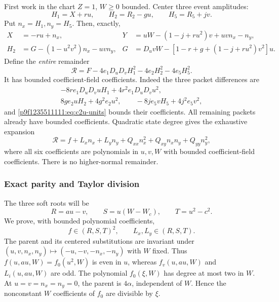 First work in the chart $Z=1$, $W\ge0$ bounded. Center three event amplitudes:
\[
 H_1=X+ru,\qquad H_2=R_2-gu,\qquad H_5=R_5+jv.
\]
Put $n_x=H_1,n_y=H_5$. Then, exactly,
\begin{align}
X&=-ru+n_x,&
Y&=uW-(1-j+ru^2)v+uvn_x-n_y,\label{p9f1235511111:eq:c2u-normal-sub}\\
H_2&=G-(1-u^2v^2)n_x-uvn_y,&
G&=D_uvW-[1-r+g+(1-j+ru^2)v^2]u.\label{p9f1235511111:eq:c2u-current}
\end{align}
Define the \emph{entire} remainder
\begin{equation}
\mathcal R=F-4e_1D_uD_vH_1^2-4e_2H_2^2-4e_5H_5^2.
\label{p9f1235511111:eq:c2u-remainder}
\end{equation}
It has bounded coefficient-field coefficients. Indeed the three packet
differences are
\begin{gather*}
-8re_1D_uD_vuH_1+4r^2e_1D_uD_vu^2,\\
8ge_2uH_2+4g^2e_2u^2,\qquad
-8je_5vH_5+4j^2e_5v^2,
\end{gather*}
and \eqref{p9f1235511111:eq:c2u-units} bounds their coefficients. All remaining
packets already have bounded coefficients. Quadratic state degree gives
the exhaustive expansion
\begin{equation}
\mathcal R=f+L_xn_x+L_yn_y
 +Q_{xx}n_x^2+Q_{xy}n_xn_y+Q_{yy}n_y^2,
\label{p9f1235511111:eq:c2u-normal-expansion}
\end{equation}
where all six coefficients are polynomials in $u,v,W$ with bounded
coefficient-field coefficients. There is no higher-normal remainder.

\subsubsection*{Exact parity and Taylor division}
The three soft roots will be
\begin{equation}
 R=au-v,\qquad S=u(W-W_c),\qquad T=u^2-c^2.
\label{p9f1235511111:eq:c2u-soft}
\end{equation}
We prove, with bounded polynomial coefficients,
\begin{equation}
 f\in(R,S,T)^2,\qquad L_x,L_y\in(R,S,T).
\label{p9f1235511111:eq:c2u-membership}
\end{equation}
The parent and its centered substitutions are invariant under
$(u,v,n_x,n_y)\mapsto(-u,-v,-n_x,-n_y)$ with $W$ fixed.
Thus $f(u,au,W)=f_0(u^2,W)$ is even in $u$, whereas
$f_v(u,au,W)$ and $L_i(u,au,W)$ are odd. The polynomial $f_0(\xi,W)$
has degree at most two in $W$. At $u=v=n_x=n_y=0$, the parent is
$4\alpha$, independent of $W$. Hence the nonconstant $W$ coefficients
of $f_0$ are divisible by $\xi$.

